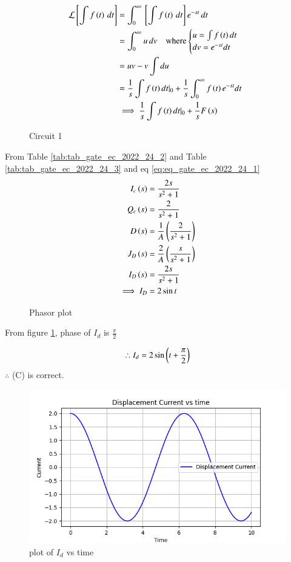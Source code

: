 \documentclass[journal,12pt,twocolumn]{IEEEtran}
\begin{document}
\begin{align}
    \mathcal{L}{}\left[\int f\left(t\right)\, dt\right] &= \int_{0}^{\infty}{}\left[\int f\left(t\right)\, dt\right]e^{-st}\, dt\\
    &= \int_{0}^{\infty}u\, dv \quad \text{where}\begin{cases}
  u =\int f\left(t\right)dt \\
  dv  =e^{-st}dt
\end{cases}\\
&= uv - v\int du\\
&= \frac{1}{s}\int f\left(t\right)dt|_0 + \frac{1}{s}\int_{0}^{\infty}f\left(t\right)e^{-st}dt\\
&\implies \frac{1}{s}\int f\left(t\right)dt|_0 + \frac{1}{s}F\left(s\right) \label{eq:eq_gate_ec_2022_24_1}
\end{align}


\begin{figure}[ht]
  \centering
      
  \caption{Circuit 1}
\end{figure}

From Table \ref{tab:tab_gate_ec_2022_24_2} and Table \ref{tab:tab_gate_ec_2022_24_3} and eq \ref{eq:eq_gate_ec_2022_24_1}
\begin{align}
    I_c\left(s\right) &= \frac{2s}{s^2 + 1}\\
    Q_c\left(s\right) &= \frac{2}{s^2 + 1}\\
    D\left(s\right) &= \frac{1}{A}\left(\frac{2}{s^2 + 1}\right)\\
    J_D\left(s\right) &= \frac{2}{A}\left(\frac{s}{s^2 + 1}\right)\\
    I_D\left(s\right) &= \frac{2s}{s^2 + 1}\\
    \implies I_D &= 2\sin{t}
\end{align}


\begin{figure}[ht]
  \centering
      
  \caption{Phasor plot}
  \label{fig:fig_gate_ec_2022_24_1}
\end{figure}

From figure \ref{fig:fig_gate_ec_2022_24_1}, phase of $I_d$ is $\frac{\pi}{2}$

\begin{align}
    \therefore I_d = 2\sin\left(t + \frac{\pi}{2}\right)
\end{align}
$\therefore$ (C) is correct.

\begin{figure}[ht]
    \centering
    \includegraphics[width=\columnwidth]{figs/Figure_1.png}
    \caption{plot of $I_d$ vs time}
    \label{fig:fig_gate_ec_2022_24_2}
\end{figure}
\end{document}
